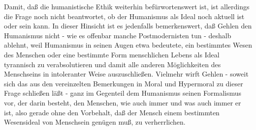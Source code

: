 \documentclass[12pt,a4paper]{article}
\begin{document}
Damit, daß die humanistische Ethik weiterhin befürwortenswert ist, ist
allerdings die Frage noch nicht beantwortet, ob der Humanismus als Ideal noch
aktuell ist oder sein kann. In dieser Hinsicht ist es jedenfalls
bemerkenswert, daß Gehlen den Humanismus nicht - wie es offenbar manche
Postmodernisten tun - deshalb ablehnt, weil Humanismus in seinen Augen etwa
bedeutete, ein bestimmtes Wesen des Menschen oder eine bestimmte Form
menschlichen Lebens als Ideal tyrannisch zu verabsolutieren und damit alle
anderen Möglichkeiten des Menschseins in intoleranter Weise auszuschließen.
Vielmehr wirft Gehlen - soweit sich das aus den vereinzelten Bemerkungen in
Moral und Hypermoral zu dieser Frage schließen läßt - ganz im Gegenteil dem
Humanismus seinen Formalismus vor, der darin besteht, den Menschen, wie auch
immer und was auch immer er ist, also gerade ohne den Vorbehalt, daß der
Mensch einem bestimmten Wesensideal von Menschsein genügen muß, zu
verherrlichen.

\newpage
\end{document}
